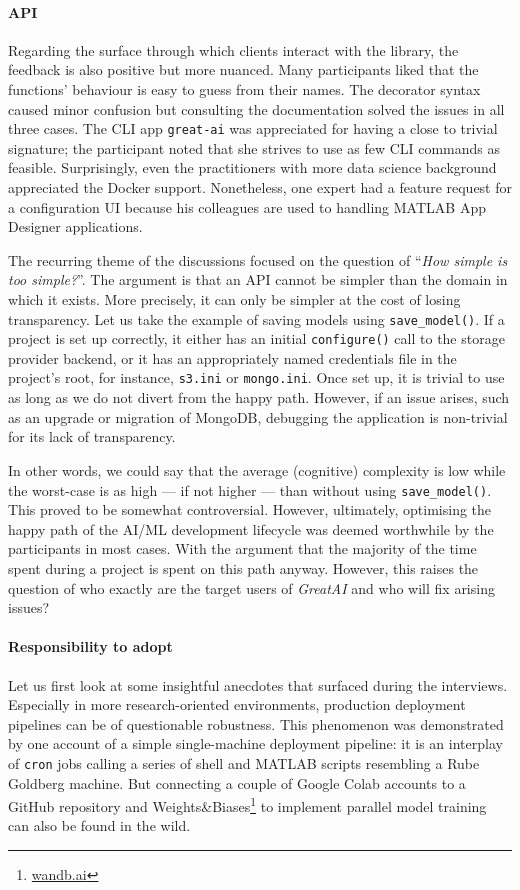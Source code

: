 \paragraph{API} Regarding the surface through which clients interact with the library, the feedback is also positive but more nuanced. Many participants liked that the functions' behaviour is easy to guess from their names. The decorator syntax caused minor confusion but consulting the documentation solved the issues in all three cases. The CLI app \texttt{great-ai} was appreciated for having a close to trivial signature; the participant noted that she strives to use as few CLI commands as feasible. Surprisingly, even the practitioners with more data science background appreciated the Docker support. Nonetheless, one expert had a feature request for a configuration UI because his colleagues are used to handling MATLAB App Designer applications.

The recurring theme of the discussions focused on the question of ``\textit{How simple is too simple?}''. The argument is that an API cannot be simpler than the domain in which it exists. More precisely, it can only be simpler at the cost of losing transparency. Let us take the example of saving models using \texttt{save\_model()}. If a project is set up correctly, it either has an initial \texttt{configure()} call to the storage provider backend, or it has an appropriately named credentials file in the project's root, for instance, \texttt{s3.ini} or \texttt{mongo.ini}. Once set up, it is trivial to use as long as we do not divert from the happy path. However, if an issue arises, such as an upgrade or migration of MongoDB, debugging the application is non-trivial for its lack of transparency.

In other words, we could say that the average (cognitive) complexity is low while the worst-case is as high --- if not higher --- than without using \texttt{save\_model()}. This proved to be somewhat controversial. However, ultimately, optimising the happy path of the AI/ML development lifecycle was deemed worthwhile by the participants in most cases. With the argument that the majority of the time spent during a project is spent on this path anyway. However, this raises the question of who exactly are the target users of \textit{GreatAI} and who will fix arising issues?

\paragraph{Responsibility to adopt} Let us first look at some insightful anecdotes that surfaced during the interviews. Especially in more research-oriented environments, production deployment pipelines can be of questionable robustness. This phenomenon was demonstrated by one account of a simple single-machine deployment pipeline: it is an interplay of \texttt{cron} jobs calling a series of shell and MATLAB scripts resembling a Rube Goldberg machine. But connecting a couple of Google Colab accounts to a GitHub repository and Weights\&Biases\footnote{\href{https://wandb.ai/site}{wandb.ai}} to implement parallel model training can also be found in the wild.

